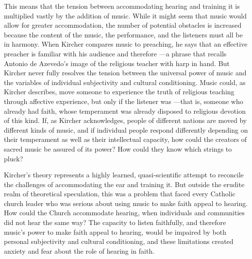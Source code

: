 This means that the tension between accommodating hearing and training it is
multiplied vastly by the addition of music.
While it might seem that music would allow for greater accommodation, the number
of potential obstacles is increased because the content of the music, the
performance, and the listeners must all be in harmony.
When Kircher compares music to preaching, he says that an effective preacher is
familiar with his audience and therefore ---a phrase that recalls Antonio de Azevedo's image of the religious
teacher with harp in hand.%
    \Autocite[551]{Kircher:Musurgia}
But Kircher never fully resolves the tension between the universal power of
music and the variables of individual subjectivity and cultural conditioning.
Music could, as Kircher describes, move someone to experience the truth of
religious teaching through affective experience, but only if the listener was
---that is, someone who already
had faith, whose temperament was already disposed to religious devotion of this
kind.
If, as Kircher acknowledges, people of different nations are moved by different
kinds of music, and if individual people respond differently depending on their
temperament as well as their intellectual capacity, how could the creators of
sacred music be assured of its power?
How could they know which strings to pluck?

Kircher's theory represents a highly learned, quasi-scientific attempt to
reconcile the challenges of accommodating the ear and training it.
But outside the erudite realm of theoretical speculation, this was a problem
that faced every Catholic church leader who was serious about using music to
make faith appeal to hearing.
How could the Church accommodate hearing, when individuals and communities did
not hear the same way?
The capacity to listen faithfully, and therefore music's power to make faith
appeal to hearing, would be impaired by both personal subjectivity and cultural
conditioning, and these limitations created anxiety and fear about the role of
hearing in faith.

